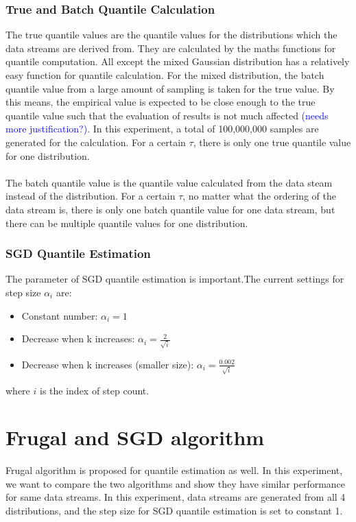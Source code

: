 \subsubsection{True and Batch Quantile Calculation}

The true quantile values are the quantile values for the distributions which the data streams are derived from. They are calculated by the maths functions for quantile computation. All except the mixed Gaussian distribution has a relatively easy function for quantile calculation. For the mixed distribution, the batch quantile value from a large amount of sampling is taken for the true value. By this means, the empirical value is expected to be close enough to the true quantile value such that the evaluation of results is not much affected \textcolor{blue}{(needs more justification?)}. In this experiment, a total of 100,000,000 samples are generated for the calculation. For a certain $\tau$, there is only one true quantile value for one distribution.
\\\\
The batch quantile value is the quantile value calculated from the data steam instead of the distribution. For a certain $\tau$, no matter what the ordering of the data stream is, there is only one batch quantile value for one data stream, but there can be multiple quantile values for one distribution.

\subsubsection{SGD Quantile Estimation}

The parameter of SGD quantile estimation is important.The current settings for step size $\alpha_i$ are:
\begin{itemize}
    \item Constant number: $\alpha_i =1$
    \item Decrease when k increases: $\alpha_i= \frac{2}{\sqrt{i}}$
    \item Decrease when k increases (smaller size): $\alpha_i= \frac{0.002}{\sqrt{i}}$
\end{itemize}
where $i$ is the index of step count.

\section{Frugal and SGD algorithm}

Frugal algorithm is proposed for quantile estimation as well. In this experiment, we want to compare the two algorithms and show they have similar performance for same data streams. In this experiment, data streams are generated from all 4 distributions, and the step size for SGD quantile estimation is set to constant 1.

